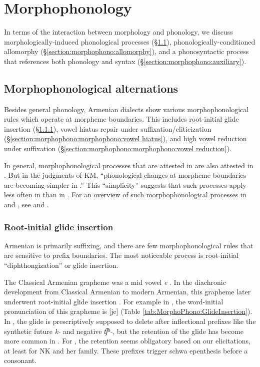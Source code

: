 \chapter{Morphophonology}\label{section:morphophono}

In terms of the interaction between morphology and phonology, we discuss mor\-phol\-o\-gi\-cal\-ly-in\-duced phonological processes (\S\ref{section:morphophono:morphophono}),  phonologically-con\-di\-tioned allomorphy (\S\ref{section:morphophono:allomorphy}), and a phonosyntactic process that references both phonology and syntax (\S\ref{section:morphophono:auxiliary}). 

\section{Morphophonological alternations}\label{section:morphophono:morphophono}
Besides general phonology, Armenian dialects show various morphophonological rules which operate at morpheme boundaries. This includes root-initial glide insertion (\S\ref{section:morphophono:morphophono:root initial glide}), vowel hiatus repair under suffixation/cliticization (\S\ref{section:morphophono:morphophono:vowel hiatus}), and high vowel   reduction under suffixation (\S\ref{section:morphophono:morphophono:vowel reduction}).  

In general,   morphophonological processes that are attested in {\seaSEA}  are also attested in {\iaIA}. But in the judgments of KM, ``phonological changes at morpheme boundaries are becoming simpler in {\iaIA}.'' This ``simplicity'' suggests that such processes apply less often in {\iaIA} than in {\seaSEA}. For an overview of such morphophonological processes in {\seaSE} and {\swaWA}, see \citet[\S1]{Vaux-1998-ArmenianPhono} and \citet[\S2]{Dolatian-2020-Diss}.


\subsection{Root-initial glide insertion }\label{section:morphophono:morphophono:root initial glide}
Armenian is primarily suffixing, and there are few morphophonological rules that are sensitive to prefix boundaries. The most noticeable process is root-initial  “diphthongization” or glide insertion.

The Classical Armenian grapheme  
was a mid vowel \textit{{e}} \citep{Macak-2017-PhonoClassicalArmenian}. In the diachronic development from Classical Armenian to modern Armenian, this grapheme later underwent root-initial glide insertion \citep{weitenberg-2008-diphthongizationInitialEInitialYArmenian}. For example  in {\seaSEA}, the word-initial pronunciation of this grapheme is [{{je}}] (Table \ref{tab:MorphoPhono:GlideInsertion}). In {\seaSE}, the glide is prescriptively supposed to delete   after inflectional prefixes like the synthetic future \textit{{k-}} and negative \textit{{t͡ʃʰ-}}, but the retention of the glide has become more common in {\seaCEA} \citep[15]{DumTragut-2009-ArmenianReferenceGrammar}. For {\iaIA}, the retention seems obligatory based on our elicitations, at least for NK and her family. These prefixes trigger schwa epenthesis before a consonant.

